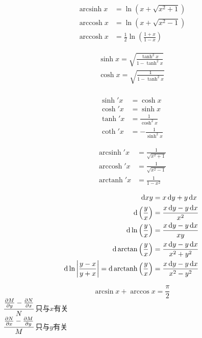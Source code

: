 \documentclass{../mathnotes-art}
\DeclareMathOperator{\arccosh}{arccosh}
\DeclareMathOperator{\arcsinh}{arcsinh}
\DeclareMathOperator{\arctanh}{arctanh}
\begin{document}
\begin{align*}
    \arcsinh x & = \ln \left( x + \sqrt{x^2 + 1} \right)
    \\
    \arccosh x & = \ln \left( x + \sqrt{x^2 - 1} \right)
    \\
    \arccosh x & = \frac{1}{2} \ln \left( \frac{1 + x}{1 - x} \right)
\end{align*}

\begin{align*}
    \sinh x=\sqrt{\frac{\tanh^{2}x}{1-\tanh^{2}x}} \\
    \cosh x=\sqrt{\frac{1}{1-\tanh^{2}x}}          \\
\end{align*}

\begin{align*}
    \sinh' x & = \cosh x                \\
    \cosh' x & = \sinh x                \\
    \tanh' x & = \frac{1}{\cosh^{2}x}   \\
    \coth' x & =- \frac{1}{\sinh^{2} x}
\end{align*}

\begin{align*}
    \arcsinh' x & =\frac{1}{\sqrt{x^{2}+1}} \\
    \arccosh' x & =\frac{1}{\sqrt{x^{2}-1}} \\
    \arctanh' x & =\frac{1}{1-x^{2}}
\end{align*}

\begin{align*}
    \d{xy}
    & =x\d{y}+y\d{x}                     \\
    \d{\left( \frac{y}{x} \right)}
    & =\frac{x\d{y}-y\d{x}}{x^{2}}       \\
    \d{\ln \left( \frac{y}{x} \right)}
    & =\frac{x\d{y}-y\d{x}}{xy}          \\
    \d{\arctan \left( \frac{y}{x} \right)}
    & =\frac{x\d{y}-y\d{x}}{x^{2}+y^{2}} \\
    \d{\ln \left| \frac{y - x}{y + x} \right|=\mathrm{d}
    \arctanh \left( \frac{y}{x} \right)} &
    =\frac{x\d{y}-y\d{x}}{x^{2}-y^{2}} \\
\end{align*}

\[\arcsin x +\arccos x =\frac{\pi}{2} \]
\(\dfrac{\pdv{M}{y} - \pdv{N}{x}}{N}\)只与\(x\)有关 \\
\(\dfrac{\pdv{N}{x} - \pdv{M}{y}}{M}\)只与\(y\)有关 \\
\end{document}

